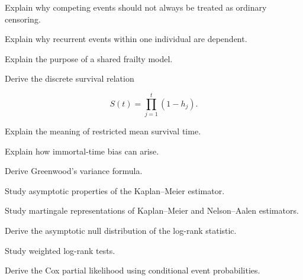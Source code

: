 \begin{exercise}[3]
Explain why competing events should not always be treated as ordinary
censoring.
\end{exercise}

\begin{exercise}[3]
Explain why recurrent events within one individual are dependent.
\end{exercise}

\begin{exercise}[3]
Explain the purpose of a shared frailty model.
\end{exercise}

\begin{exercise}[3]
Derive the discrete survival relation

\[
S(t)
=
\prod_{j=1}^{t}
(
1-h_j
).
\]
\end{exercise}

\begin{exercise}[3]
Explain the meaning of restricted mean survival time.
\end{exercise}

\begin{exercise}[3]
Explain how immortal-time bias can arise.
\end{exercise}

\begin{exercise}[4]
Derive Greenwood's variance formula.
\end{exercise}

\begin{exercise}[4]
Study asymptotic properties of the Kaplan--Meier estimator.
\end{exercise}

\begin{exercise}[4]
Study martingale representations of Kaplan--Meier and Nelson--Aalen
estimators.
\end{exercise}

\begin{exercise}[4]
Derive the asymptotic null distribution of the log-rank statistic.
\end{exercise}

\begin{exercise}[4]
Study weighted log-rank tests.
\end{exercise}

\begin{exercise}[4]
Derive the Cox partial likelihood using conditional event
probabilities.
\end{exercise}

